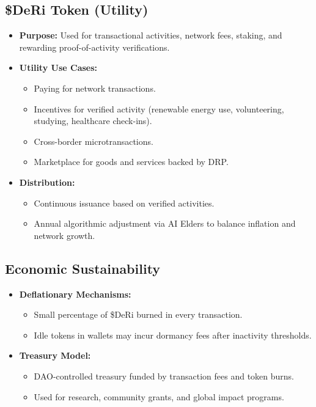 \documentclass[11pt,a4paper]{article}
\begin{document}
\subsection{\$DeRi Token (Utility)}
\begin{itemize}
    \item \textbf{Purpose:} Used for transactional activities, network fees, staking, and rewarding proof-of-activity verifications.  
    \item \textbf{Utility Use Cases:}  
        \begin{itemize}
            \item Paying for network transactions.  
            \item Incentives for verified activity (renewable energy use, volunteering, studying, healthcare check-ins).  
            \item Cross-border microtransactions.  
            \item Marketplace for goods and services backed by DRP.  
        \end{itemize}
    \item \textbf{Distribution:}  
        \begin{itemize}
            \item Continuous issuance based on verified activities.  
            \item Annual algorithmic adjustment via AI Elders to balance inflation and network growth.  
        \end{itemize}
\end{itemize}

\subsection{Economic Sustainability}
\begin{itemize}
    \item \textbf{Deflationary Mechanisms:}  
        \begin{itemize}
            \item Small percentage of \$DeRi burned in every transaction.  
            \item Idle tokens in wallets may incur dormancy fees after inactivity thresholds.  
        \end{itemize}
    \item \textbf{Treasury Model:}  
        \begin{itemize}
            \item DAO-controlled treasury funded by transaction fees and token burns.  
            \item Used for research, community grants, and global impact programs.  
        \end{itemize}
\end{itemize}
\end{document}

